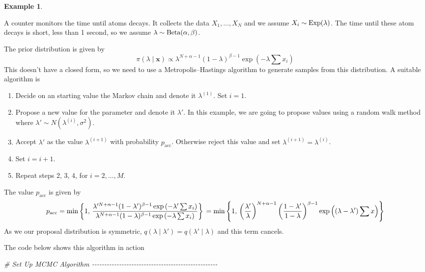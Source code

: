 \documentclass[
]{book}
\newenvironment{Shaded}{\begin{snugshade}}{\end{snugshade}}
\newcommand{\CommentTok}[1]{\textcolor[rgb]{0.56,0.35,0.01}{\textit{#1}}}
\providecommand{\tightlist}{%
  \setlength{\itemsep}{0pt}\setlength{\parskip}{0pt}}
\theoremstyle{definition}
\theoremstyle{definition}
\newtheorem{example}{Example}[chapter]
\theoremstyle{definition}
\theoremstyle{definition}
\theoremstyle{remark}
\begin{document}
\begin{example}
\protect\hypertarget{exm:norm}{}\label{exm:norm}

A counter monitors the time until atoms decays. It collects the data \(X_1, \ldots, X_N\) and we assume \(X_i \sim \hbox{Exp}(\lambda)\). The time until these atom decays is short, less than 1 second, so we assume \(\lambda \sim \hbox{Beta}(\alpha, \beta)\).

The prior distribution is given by
\[
\pi(\lambda \mid \boldsymbol{x}) \propto \lambda^{N + \alpha - 1} (1 - \lambda)^{\beta - 1}\exp\left(-\lambda \sum x_i\right)
\]
This doesn't have a closed form, so we need to use a Metropolis--Hastings algorithm to generate samples from this distribution. A suitable algorithm is

\begin{enumerate}
\def\labelenumi{\arabic{enumi}.}
\tightlist
\item
  Decide on an starting value the Markov chain and denote it \(\lambda^{(1)}\). Set \(i = 1\).
\item
  Propose a new value for the parameter and denote it \(\lambda'\). In this example, we are going to propose values using a random walk method where \(\lambda' \sim N(\lambda^{(i)}, \sigma^2)\).
\item
  Accept \(\lambda'\) as the value \(\lambda^{(i+1)}\) with probability \(p_{\textrm{acc}}\). Otherwise reject this value and set \(\lambda^{(i+1)} = \lambda^{(i)}\).\\
\item
  Set \(i = i + 1\).
\item
  Repeat steps 2, 3, 4, for \(i = 2, \ldots, M\).
\end{enumerate}

The value \(p_{\textrm{acc}}\) is given by
\[
p_{\textrm{acc}} = \min \left\{1, \, \frac{\lambda'^{N + \alpha - 1} (1 - \lambda')^{\beta - 1}\exp\left(-\lambda' \sum x_i\right)}{\lambda^{N + \alpha - 1} (1 - \lambda)^{\beta - 1}\exp\left(-\lambda \sum x_i\right)}\right\} \\
= \min \left\{1, \, \left(\frac{\lambda'}{\lambda}\right)^{N + \alpha - 1} \left(\frac{1-\lambda'}{1-\lambda}\right)^{\beta -1} \exp\left((\lambda- \lambda')\sum x\right)\right\} 
\]
As we our proposal distribution is symmetric, \(q(\lambda \mid \lambda') = q(\lambda' \mid \lambda)\) and this term cancels.

The code below shows this algorithm in action

\begin{Shaded}
\begin{Highlighting}[]
\CommentTok{\# Set Up MCMC Algorithm {-}{-}{-}{-}{-}{-}{-}{-}{-}{-}{-}{-}{-}{-}{-}{-}{-}{-}{-}{-}{-}{-}{-}{-}{-}{-}{-}{-}{-}{-}{-}{-}{-}{-}{-}{-}{-}{-}{-}{-}{-}{-}{-}{-}{-}{-}{-}{-}{-}{-}{-}}


\end{Highlighting}
\end{Shaded}
\end{example}
\end{document}
